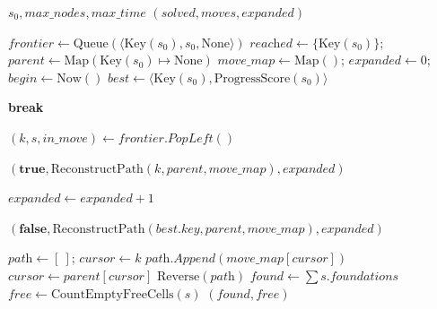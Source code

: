   \begin{algorithm}[H]
    \caption{Breadth-First Search (BFS) - Main Loop}
    \begin{algorithmic}[1]
        \Require $s_0, \textit{max\_nodes}, \textit{max\_time}$
        \Ensure $(solved, moves, \textit{expanded})$
        
            \State $\textit{frontier} \gets \text{Queue}(\langle \text{Key}(s_0), s_0, \text{None} \rangle)$
            \State $\textit{reached} \gets \{ \text{Key}(s_0) \}$; \quad $\textit{parent} \gets \text{Map}(\text{Key}(s_0) \mapsto \text{None})$
            \State $\textit{move\_map} \gets \text{Map}()$; \quad $\textit{expanded} \gets 0$; \quad $\textit{begin} \gets \text{Now}()$
            \State $\textit{best} \gets \langle \text{Key}(s_0), \text{ProgressScore}(s_0) \rangle$

                    \State \textbf{break}
                \EndIf
                
                \State $(k, s, \textit{in\_move}) \gets \textit{frontier.PopLeft}()$
                \State {} 

                    \State \Return $(\textbf{true}, \text{ReconstructPath}(k, \textit{parent}, \textit{move\_map}), \textit{expanded})$
                \EndIf

                \State $\textit{expanded} \gets \textit{expanded} + 1$
                \State {}
            \EndWhile
            
            \State \Return $(\textbf{false}, \text{ReconstructPath}(\textit{best.key}, \textit{parent}, \textit{move\_map}), \textit{expanded})$
        \EndFunction
    \end{algorithmic}
\end{algorithm}
\begin{algorithm}[H]
    \caption{BFS - Helper Functions}
    \begin{algorithmic}[1]
            \State $\textit{path} \gets [\ ]$; \quad $\textit{cursor} \gets k$
                \State $\textit{path.Append}(\textit{move\_map}[\textit{cursor}])$
                \State $\textit{cursor} \gets \textit{parent}[\textit{cursor}]$
            \EndWhile
            \State \Return $\text{Reverse}(\textit{path})$
        \EndFunction
        \Statex
            \State $\textit{found} \gets \sum \textit{s.foundations}$
            \State $\textit{free} \gets \text{CountEmptyFreeCells}(s)$
            \State \Return $(\textit{found}, \textit{free})$
        \EndFunction
    \end{algorithmic}
\end{algorithm}
